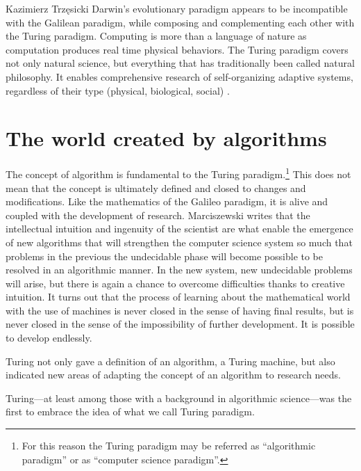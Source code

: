 \begin{artengenv}{Kazimierz Trzęsicki}
Darwin's evolutionary paradigm appears to be incompatible with the Galilean paradigm, while composing and complementing each other with the Turing paradigm. Computing is more than a language of nature as computation produces real time physical behaviors. The Turing paradigm covers not only natural science, but everything that has traditionally been called natural philosophy.  It enables comprehensive research of self-organizing adaptive systems, regardless of their type (physical, biological, social) \parencite{Dodig2013,Dodig2022}.



\section{The world created by algorithms} 

The concept of algorithm is fundamental to the Turing paradigm.\footnote{For this reason the Turing paradigm may be referred as ``algorithmic paradigm'' or as ``computer science paradigm''.} This does not mean that the concept is ultimately defined and closed to changes and modifications. Like the mathematics of the Galileo paradigm, it is alive and coupled with the development of research. Marciszewski writes \parencite[p.164]{MarciszewskiStacewicz2011} that the intellectual intuition and ingenuity of the scientist are what enable the emergence of new algorithms that will strengthen the computer science system so much that problems in the previous the undecidable phase will become possible to be resolved in an algorithmic manner. In the new system, new undecidable problems will arise, but there is again a chance to overcome difficulties thanks to creative intuition. It turns out that the process of learning about the mathematical world with the use of machines is never closed in the sense of having final results, but is never closed in the sense of the impossibility of further development. It is possible to develop endlessly.

Turing not only gave a definition of an algorithm, a Turing machine, but also indicated new areas of adapting the concept of an algorithm to research needs.

Turing---at least among those with a background  in algorithmic science---was the first to embrace the idea of what we call Turing paradigm.


\end{artengenv}
